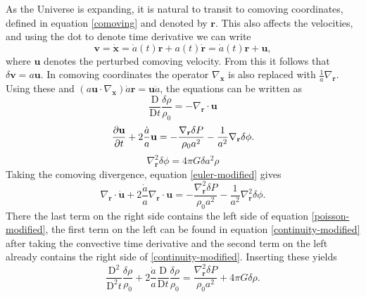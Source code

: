 \documentclass[english, oneside]{HYgradu}
\begin{document}
As the Universe is expanding, it is natural to transit to comoving coordinates, defined in equation \ref{comoving} and denoted by $\mathbf{r}$. This also affects the velocities, and using the dot to denote time derivative we can write
\begin{equation}
\mathbf{v} = \dot{\mathbf{x}} = \dot{a}(t)\mathbf{r} + a(t)\dot{\mathbf{r}} = \dot{a}(t)\mathbf{r} + \mathbf{u},
\end{equation}
where $\mathbf{u}$ denotes the perturbed comoving velocity. From this it follows that $\delta \mathbf{v} = a \mathbf{u}$. In comoving coordinates the operator $\nabla_\mathbf{x}$ is also replaced with $\frac{1}{a}\nabla_\mathbf{r}$. Using these and $(a\mathbf{u}\cdot\nabla_\mathbf{x})\dot{a}\mathbf{r}=\mathbf{u}\dot{a}$, the equations can be written as
\begin{equation}\label{continuity-modified}
\frac{\textrm{D}}{\textrm{D}t} \frac{\delta \rho}{\rho_0} = -\nabla_\mathbf{r} \cdot \mathbf{u}
\end{equation}
\begin{equation}\label{euler-modified}
\pdv{\mathbf{u}}{t} + 2 \frac{\dot a}{a}\mathbf{u} = - \frac{\nabla_\mathbf{r} \delta P}{\rho_0 a^2} - \frac{1}{a^2}\nabla_\mathbf{r} \delta \phi.
\end{equation}
\begin{equation}\label{poisson-modified}
\nabla_\mathbf{r}^2\delta \phi = 4 \pi G \delta a^2 \rho
\end{equation}
Taking the comoving divergence, equation \ref{euler-modified} gives
\begin{equation}
\nabla_\mathbf{r} \cdot \dot{\mathbf{u}} + 2 \frac{\dot a}{a}\nabla_\mathbf{r} \cdot \mathbf{u} = - \frac{\nabla_\mathbf{r}^2 \delta P}{\rho_0 a^2} - \frac{1}{a^2}\nabla_\mathbf{r}^2 \delta \phi.
\end{equation}
There the last term on the right side contains the left side of equation \ref{poisson-modified}, the first term on the left can be found in equation \ref{continuity-modified} after taking the convective time derivative and the second term on the left already contains the right side of \ref{continuity-modified}. Inserting these yields
\begin{equation}\label{euler-insertions1}
\frac{\textrm{D}^2}{\textrm{D}^2 t} \frac{\delta \rho}{\rho_0} + 2 \frac{\dot a}{a} \frac{\textrm{D}}{\textrm{D} t} \frac{\delta \rho}{\rho_0} = \frac{\nabla_\mathbf{r}^2 \delta P}{\rho_0 a^2} + 4 \pi G \delta \rho.
\end{equation}
\end{document}
